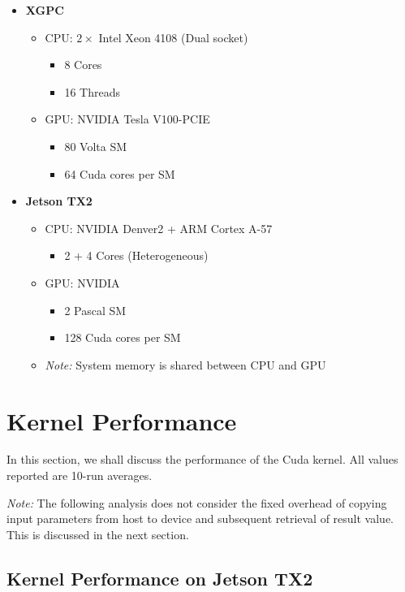 \documentclass[a4paper,12pt]{article}
\begin{document}
\begin{itemize}
  \item \textbf{XGPC}
  \begin{itemize}
    \item CPU: $2 \times$ Intel Xeon 4108 (Dual socket)
    \begin{itemize}
      \item 8 Cores
      \item 16 Threads
    \end{itemize}
    \item GPU: NVIDIA Tesla V100-PCIE
    \begin{itemize}
      \item 80 Volta SM
      \item 64 Cuda cores per SM
    \end{itemize}
  \end{itemize}
  \item \textbf{Jetson TX2}
  \begin{itemize}
    \item CPU: NVIDIA Denver2 + ARM Cortex A-57
    \begin{itemize}
      \item 2 + 4 Cores (Heterogeneous)
    \end{itemize}
    \item GPU: NVIDIA
    \begin{itemize}
      \item 2 Pascal SM
      \item 128 Cuda cores per SM
    \end{itemize}
    \item \textit{Note:} System memory is shared between CPU and GPU
  \end{itemize}
\end{itemize}

\section{Kernel Performance}

In this section, we shall discuss the performance of the Cuda kernel. All values reported are 10-run averages.

\textit{Note:} The following analysis does not consider the fixed overhead of copying input parameters from host to device and subsequent retrieval of result value. This is discussed in the next section.

\subsection{Kernel Performance on Jetson TX2}
\end{document}

